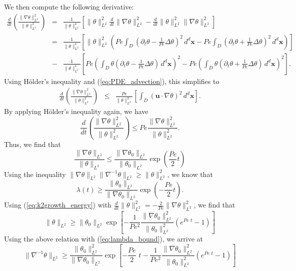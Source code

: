 \documentclass[12pt]{iopart}
\newcommand{\ddt}[1]{\frac{d #1}{dt}}
\newcommand{\hmone}[1]{\|\nabla^{-1} #1\|_{L^{2}}}
\newcommand{\ltwo}[1]{\|#1\|_{L^{2}}}
\newcommand{\hone}[1]{\| \nabla #1\|_{L^{2}}}
\newcommand{\sint}[1]{\int_{D} #1 \, d^{d}\mathbf{x}}
\renewcommand{\vec}[1]{\mathbf{#1}}
\newcommand{\ppt}[1]{\partial_{t} #1}
\newcommand{\lap}{\Delta }
\newcommand{\pbrac}[1]{\left( #1 \right)}
\newcommand{\sbrac}[1]{\left[ #1 \right]}
\begin{document}
We then compute the following derivative:
%
\begin{eqnarray*}
	\ddt{} \pbrac{ \frac{\hone{\theta}^2}{\ltwo{\theta}^2} } 
			&=& \frac{1}{\ltwo{\theta}^4}
			\sbrac{
				\ltwo{\theta}^2\ddt{}\hone{\theta}^2
				-\ddt{}\ltwo{\theta}^2\hone{\theta}^2			
			}\\
			&=& \frac{1}{\ltwo{\theta}^4}
			\sbrac{
				\ltwo{\theta}^2
				\pbrac{
					Pe \sint{\left(\ppt{\theta}
	 									-\frac{1}{Pe}\lap \theta\right)^2} 
 					-Pe\sint{\left(\ppt{\theta}
	 									+\frac{1}{Pe}\lap \theta\right)^2} 
				}
			}\\
		&-&\frac{1}{\ltwo{\theta}^4}
			\sbrac{
				Pe
				\pbrac{
					 \sint{\theta\left(\ppt{\theta}
	 									-\frac{1}{Pe}\lap \theta\right)} 
 				}^2		
 				-
 				Pe
 				\pbrac{
					 \sint{\theta\left(\ppt{\theta}
	 									+\frac{1}{Pe}\lap \theta\right)} 
 				}^2					
			}.
\end{eqnarray*}
%
Using H\"older's inequality and (\ref{eq:PDE_advection}), this simplifies to
%
\begin{eqnarray*}
	\ddt{} \pbrac{ \frac{\hone{\theta}^2}{\ltwo{\theta}^2} } 
			&\leq & \frac{Pe}{\ltwo{\theta}^2}
			\sbrac{
					 \sint{(\vec{u}\cdot \nabla \theta)^2} 
			}.
\end{eqnarray*}
By applying H\"older's inequality again, we have
\begin{equation}
\label{eq:k2growth_energy}
	\ddt{} 
		\pbrac{ 
			\frac{\hone{\theta}^2}{\ltwo{\theta}^2} 
		} 
		\leq  
		Pe
		\frac{\hone{\theta}^2}{\ltwo{\theta}^2} .
\end{equation}
%
Thus, we find that 
%
\begin{equation}
		\frac{\hone{\theta}}{\ltwo{\theta}} 
		\leq  
		\frac{\hone{\theta_0}}{\ltwo{\theta_0}}
		\exp{\pbrac{\frac{Pe}{2} t}}
\end{equation}
%
Using the inequality $\hone{\theta}\hmone{\theta}\geq \ltwo{\theta}^2$, we know that 
%
\begin{equation}
\label{eq:lambda_bound}
\lambda(t) \geq \frac{\ltwo{\theta_0}}{\hone{\theta_0}}\exp{\pbrac{-\frac{Pe}{2}t}}.
\end{equation}
%
Using (\ref{eq:k2growth_energy}) with  $\ddt{}\ltwo{\theta}^2 = -\frac{2}{Pe} \hone{\theta}^2$, 
we find that
%
\begin{equation}
\ltwo{\theta}\geq \ltwo{\theta_{0}}\exp\left[-\frac{1}{Pe^2}\frac{\hone{\theta_0}^2}{\ltwo{\theta_0}^2}\left(e^{Pe \, \, t}-1\right)\right]
\end{equation}
%
Using the above relation with  (\ref{eq:lambda_bound}), we arrive at
%
\begin{equation}
\hmone{\theta}\geq \frac{\ltwo{\theta_{0}}^2}{\hone{\theta_0}}\exp\left[-\frac{Pe}{2} \,\, t-\frac{1}{Pe^2}\frac{\hone{\theta_0}^2}{\ltwo{\theta_0}^2}\left(e^{Pe \,\, t}-1\right)\right]
\end{equation}
\end{document}
